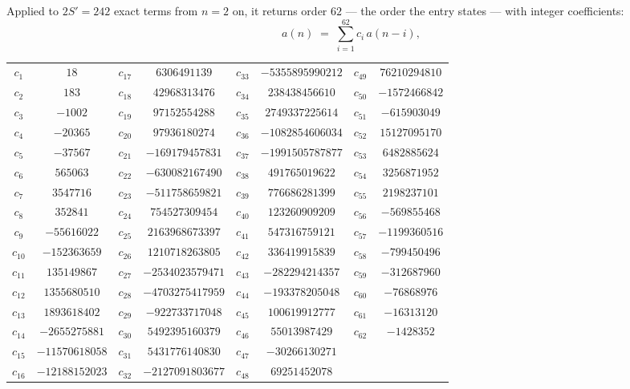 \documentclass[11pt,a4paper]{article}
\theoremstyle{plain}
\theoremstyle{definition}
\begin{document}
Applied to $2S'=242$ exact terms from $n=2$ on, it returns order $62$ --- the
order the entry states --- with integer coefficients:
\[
a(n)\;=\;\sum_{i=1}^{62}c_i\,a(n-i),
\]
\begin{center}\small
\begin{tabular}{cccccccc}
$c_{1}$ & $18$ & $c_{17}$ & $6306491139$ & $c_{33}$ & $-5355895990212$ & $c_{49}$ & $76210294810$ \\
$c_{2}$ & $183$ & $c_{18}$ & $42968313476$ & $c_{34}$ & $238438456610$ & $c_{50}$ & $-1572466842$ \\
$c_{3}$ & $-1002$ & $c_{19}$ & $97152554288$ & $c_{35}$ & $2749337225614$ & $c_{51}$ & $-615903049$ \\
$c_{4}$ & $-20365$ & $c_{20}$ & $97936180274$ & $c_{36}$ & $-1082854606034$ & $c_{52}$ & $15127095170$ \\
$c_{5}$ & $-37567$ & $c_{21}$ & $-169179457831$ & $c_{37}$ & $-1991505787877$ & $c_{53}$ & $6482885624$ \\
$c_{6}$ & $565063$ & $c_{22}$ & $-630082167490$ & $c_{38}$ & $491765019622$ & $c_{54}$ & $3256871952$ \\
$c_{7}$ & $3547716$ & $c_{23}$ & $-511758659821$ & $c_{39}$ & $776686281399$ & $c_{55}$ & $2198237101$ \\
$c_{8}$ & $352841$ & $c_{24}$ & $754527309454$ & $c_{40}$ & $123260909209$ & $c_{56}$ & $-569855468$ \\
$c_{9}$ & $-55616022$ & $c_{25}$ & $2163968673397$ & $c_{41}$ & $547316759121$ & $c_{57}$ & $-1199360516$ \\
$c_{10}$ & $-152363659$ & $c_{26}$ & $1210718263805$ & $c_{42}$ & $336419915839$ & $c_{58}$ & $-799450496$ \\
$c_{11}$ & $135149867$ & $c_{27}$ & $-2534023579471$ & $c_{43}$ & $-282294214357$ & $c_{59}$ & $-312687960$ \\
$c_{12}$ & $1355680510$ & $c_{28}$ & $-4703275417959$ & $c_{44}$ & $-193378205048$ & $c_{60}$ & $-76868976$ \\
$c_{13}$ & $1893618402$ & $c_{29}$ & $-922733717048$ & $c_{45}$ & $100619912777$ & $c_{61}$ & $-16313120$ \\
$c_{14}$ & $-2655275881$ & $c_{30}$ & $5492395160379$ & $c_{46}$ & $55013987429$ & $c_{62}$ & $-1428352$ \\
$c_{15}$ & $-11570618058$ & $c_{31}$ & $5431776140830$ & $c_{47}$ & $-30266130271$ &  &  \\
$c_{16}$ & $-12188152023$ & $c_{32}$ & $-2127091803677$ & $c_{48}$ & $69251452078$ &  &  \\
\end{tabular}
\end{center}
\end{document}
